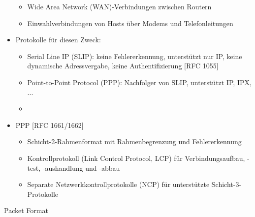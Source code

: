 \documentclass[a4paper]{article}
\begin{document}
\begin{multicols}{3}
\begin{itemize}
              \begin{itemize}
                  \item
                        Wide Area Network (WAN)-Verbindungen zwischen Routern
                  \item
                        Einwahlverbindungen von Hosts über Modems und Telefonleitungen
              \end{itemize}
        \item
              Protokolle für diesen Zweck:

              \begin{itemize}
                  \item
                        Serial Line IP (SLIP): keine Fehlererkennung, unterstützt nur IP,
                        keine dynamische Adressvergabe, keine Authentifizierung {[}RFC
                        1055{]}
                  \item
                        Point-to-Point Protocol (PPP): Nachfolger von SLIP, unterstützt IP,
                        IPX, ...
                  \item
              \end{itemize}
        \item
              PPP {[}RFC 1661/1662{]}

              \begin{itemize}
                  \item
                        Schicht-2-Rahmenformat mit Rahmenbegrenzung und Fehlererkennung
                  \item
                        Kontrollprotokoll (Link Control Protocol, LCP) für
                        Verbindungsaufbau, -test, -aushandlung und -abbau
                  \item
                        Separate Netzwerkkontrollprotokolle (NCP) für unterstützte
                        Schicht-3-Protokolle
              \end{itemize}
    \end{itemize}

    Packet Format


\end{multicols}
\end{document}
